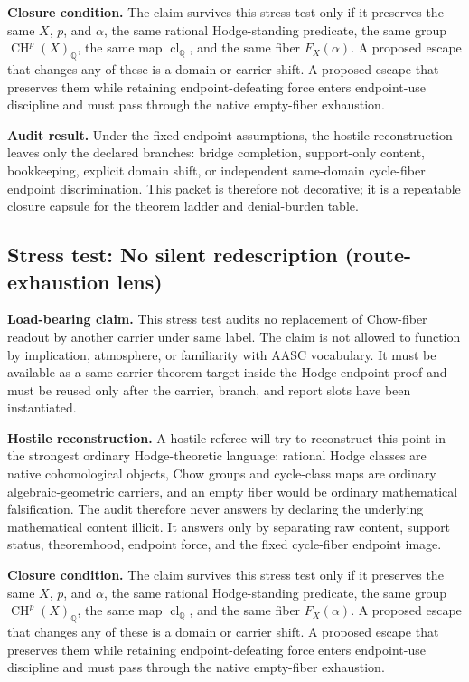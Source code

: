 \documentclass[11pt]{article}
\newcommand{\QQ}{\mathbb{Q}}
\newcommand{\CH}{\operatorname{CH}}
\newcommand{\clQ}{\operatorname{cl}_{\QQ}}
\begin{document}
\par\noindent\textbf{Closure condition.} The claim survives this stress test only if it preserves the same $X$, $p$, and $\alpha$, the same rational Hodge-standing predicate, the same group $\CH^p(X)_\QQ$, the same map $\clQ$, and the same fiber $F_X(\alpha)$. A proposed escape that changes any of these is a domain or carrier shift. A proposed escape that preserves them while retaining endpoint-defeating force enters endpoint-use discipline and must pass through the native empty-fiber exhaustion.

\par\noindent\textbf{Audit result.} Under the fixed endpoint assumptions, the hostile reconstruction leaves only the declared branches: bridge completion, support-only content, bookkeeping, explicit domain shift, or independent same-domain cycle-fiber endpoint discrimination. This packet is therefore not decorative; it is a repeatable closure capsule for the theorem ladder and denial-burden table.


\subsection{Stress test: No silent redescription (route-exhaustion lens)}

\par\noindent\textbf{Load-bearing claim.} This stress test audits no replacement of Chow-fiber readout by another carrier under same label. The claim is not allowed to function by implication, atmosphere, or familiarity with AASC vocabulary. It must be available as a same-carrier theorem target inside the Hodge endpoint proof and must be reused only after the carrier, branch, and report slots have been instantiated.

\par\noindent\textbf{Hostile reconstruction.} A hostile referee will try to reconstruct this point in the strongest ordinary Hodge-theoretic language: rational Hodge classes are native cohomological objects, Chow groups and cycle-class maps are ordinary algebraic-geometric carriers, and an empty fiber would be ordinary mathematical falsification. The audit therefore never answers by declaring the underlying mathematical content illicit. It answers only by separating raw content, support status, theoremhood, endpoint force, and the fixed cycle-fiber endpoint image.

\par\noindent\textbf{Closure condition.} The claim survives this stress test only if it preserves the same $X$, $p$, and $\alpha$, the same rational Hodge-standing predicate, the same group $\CH^p(X)_\QQ$, the same map $\clQ$, and the same fiber $F_X(\alpha)$. A proposed escape that changes any of these is a domain or carrier shift. A proposed escape that preserves them while retaining endpoint-defeating force enters endpoint-use discipline and must pass through the native empty-fiber exhaustion.
\end{document}
